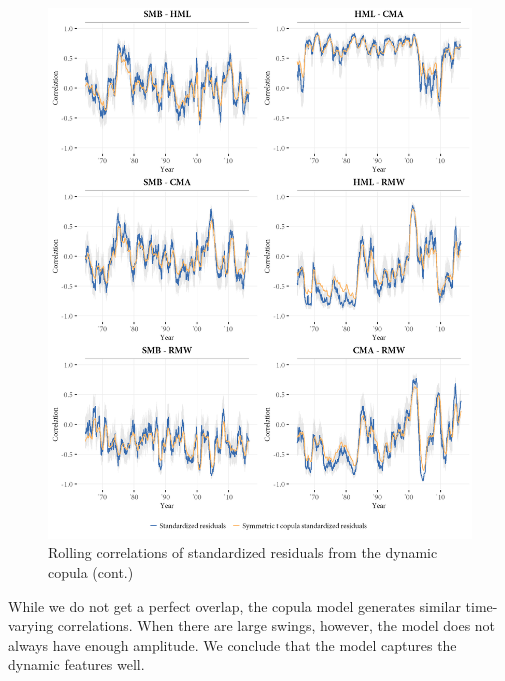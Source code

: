 \begin{figure}[!ht]
  \ContinuedFloat
  \centering
  \includegraphics[width=\textwidth]{graphics/rolling_simulated2.png}
  \footnotesize
  \caption{Rolling correlations of standardized residuals from the dynamic copula (cont.)}
\end{figure}

While we do not get a perfect overlap, the copula model generates similar time-varying correlations. When there are large swings, however, the model does not always have enough amplitude. We conclude that the model captures the dynamic features well.
